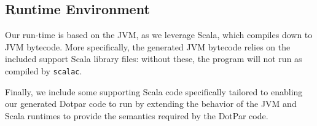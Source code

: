 \subsection{Runtime Environment}

Our run-time is based on the JVM, as we leverage Scala, which compiles
down to JVM bytecode. More specifically, the generated JVM bytecode
relies on the included support Scala library files: without these, the
program will not run as compiled by \texttt{scalac}.

Finally, we include some supporting Scala code specifically tailored
to enabling our generated Dotpar code to run by extending the behavior
of the JVM and Scala runtimes to provide the semantics required by the
DotPar code.
